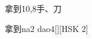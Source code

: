 \begin{entry}{拿到}{10,8}{⼿、⼑}
  \begin{phonetics}{拿到}{na2 dao4}[][HSK 2]
  \end{phonetics}
\end{entry}
